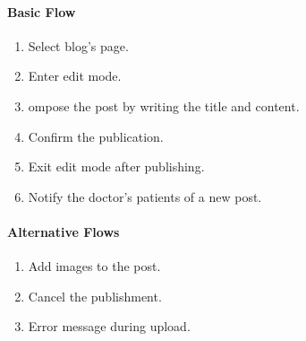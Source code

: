 \documentclass{report}
\begin{document}
\begin{multicols}{2}
    \paragraph{Basic Flow}
    \begin{enumerate}
        \item Select blog's page.
        \item Enter edit mode.
        \item ompose the post by writing the title and content.
        \item Confirm the publication.
        \item Exit edit mode after publishing.
        \item Notify the doctor's patients of a new post.
    \end{enumerate}
    \columnbreak

    \paragraph{Alternative Flows}
    \begin{enumerate}[label=A\arabic*.]
        \item Add images to the post.
        \item Cancel the publishment.
        \item Error message during upload.
    \end{enumerate}
\end{multicols}
\end{document}
